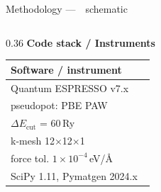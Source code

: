 \begin{frame}{Methodology —~\, schematic}
\begin{columns}[T, totalwidth=\textwidth]
    \begin{column}{0.36\textwidth}
      \vspace{-2pt}
      \textbf{\color{sustBlueDark}Code stack / Instruments}\\[2pt]
      \begin{tabular}{@{}p{0.95\linewidth}@{}}
        \toprule
        \textbf{Software / instrument} \\
        \midrule
        \scriptsize Quantum ESPRESSO v7.x \\
        \scriptsize pseudopot: PBE PAW \\
        \scriptsize $\Delta E_{\text{cut}}$ = 60\,Ry \\
        \scriptsize k-mesh 12$\times$12$\times$1 \\
        \scriptsize force tol. $1\times10^{-4}$\,eV/\AA \\
        \scriptsize SciPy 1.11, Pymatgen 2024.x \\
        \bottomrule
      \end{tabular}
      \vspace{4pt}
    \end{column}
  \end{columns}
\end{frame}

